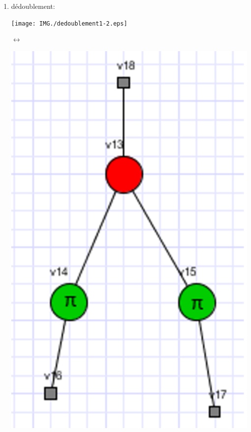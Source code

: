 \documentclass[a4paper,oneside]{book}
\begin{document}
\begin{enumerate}
\item dédoublement:
\begin{center}
\begin{minipage}[c]{0.25\textwidth}
\flushright\texttt{[image: IMG./dedoublement1-2.eps]}
\end{minipage}
\hspace{0.5cm}\Huge{$\longleftrightarrow$}
\begin{minipage}[c]{0.25\textwidth}
\includegraphics[scale=0.3]{IMG/dedoublement2-2.eps}
\end{minipage}
\label{dedoublement}
\end{center}


\end{enumerate}
\end{document}

